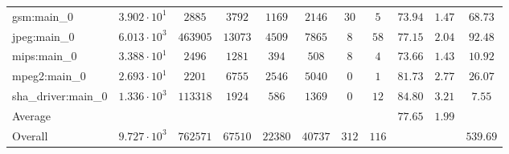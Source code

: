 \begin{tabular}{|l|c|c|c|c|c|c|c|c|c|c|}
gsm:main\_0             & $ 3.902 \cdot 10^{1} $ & $ 2885   $ & $ 3792  $ & $ 1169  $ & $ 2146  $ & $ 30  $ & $ 5   $ & $ 73.94       $ & $ 1.47    $ & $ 68.73   $ \\
jpeg:main\_0            & $ 6.013 \cdot 10^{3} $ & $ 463905 $ & $ 13073 $ & $ 4509  $ & $ 7865  $ & $ 8   $ & $ 58  $ & $ 77.15       $ & $ 2.04    $ & $ 92.48   $ \\
mips:main\_0            & $ 3.388 \cdot 10^{1} $ & $ 2496   $ & $ 1281  $ & $ 394   $ & $ 508   $ & $ 8   $ & $ 4   $ & $ 73.66       $ & $ 1.43    $ & $ 10.92   $ \\
mpeg2:main\_0           & $ 2.693 \cdot 10^{1} $ & $ 2201   $ & $ 6755  $ & $ 2546  $ & $ 5040  $ & $ 0   $ & $ 1   $ & $ 81.73       $ & $ 2.77    $ & $ 26.07   $ \\
sha\_driver:main\_0     & $ 1.336 \cdot 10^{3} $ & $ 113318 $ & $ 1924  $ & $ 586   $ & $ 1369  $ & $ 0   $ & $ 12  $ & $ 84.80       $ & $ 3.21    $ & $ 7.55    $ \\
\hline
Average                 & $                    $ & $        $ & $       $ & $       $ & $       $ & $     $ & $     $ & $ 77.65       $ & $ 1.99    $ & $         $ \\
\hline
Overall                 & $ 9.727 \cdot 10^{3} $ & $ 762571 $ & $ 67510 $ & $ 22380 $ & $ 40737 $ & $ 312 $ & $ 116 $ & $             $ & $         $ & $ 539.69  $ \\
\hline
\end{tabular}
